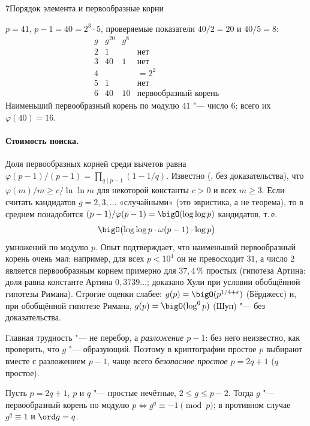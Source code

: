 \begin{lecture}{7}{Порядок элемента и первообразные корни}
\begin{example}\label{l7:ex-41}
$p = 41$, $p - 1 = 40 = 2^3 \cdot 5$, проверяемые показатели $40/2 = 20$ и $40/5 = 8$:
\[
\begin{array}{c|cc|l}
  g & g^{20} & g^{8} & \\ \hline
  2 & 1 & & \text{нет} \\
  3 & 40 & 1 & \text{нет} \\
  4 & & & = 2^2 \\
  5 & 1 & & \text{нет} \\
  6 & 40 & 10 & \text{первообразный корень}
\end{array}
\]
Наименьший первообразный корень по модулю $41$ "--- число $6$; всего их $\varphi(40) = 16$.
\end{example}


\paragraph{Стоимость поиска.} Доля первообразных корней среди вычетов равна
$\varphi(p - 1)/(p - 1) = \prod_{q \mid p - 1}(1 - 1/q)$. Известно
(\cite[теорема~328]{hardy-wright}, без доказательства), что
$\varphi(m)/m \ge c/\ln\ln m$ для некоторой константы $c > 0$ и всех $m \ge 3$. Если считать
кандидатов $g = 2, 3, \dots$ «случайными» (это эвристика, а не теорема), то в среднем
понадобится $(p - 1)/\varphi(p - 1) = \bigO(\log\log p)$ кандидатов, т.\,е.
\[
  \bigO\bigl(\log\log p \cdot \omega(p - 1) \cdot \log p\bigr)
\]
умножений по модулю $p$. Опыт подтверждает, что наименьший первообразный корень очень мал:
например, для всех $p < 10^4$ он не превосходит $31$, а число $2$ является первообразным
корнем примерно для $37{,}4\,\%$ простых (гипотеза Артина: доля равна константе Артина
$0{,}3739\ldots$; доказано Хули при условии обобщённой гипотезы Римана). Строгие оценки
слабее: $g(p) = \bigO(p^{1/4 + \varepsilon})$ (Бёрджесс) и, при обобщённой гипотезе Римана,
$g(p) = \bigO(\log^6 p)$ (Шуп) "--- без доказательства.

Главная трудность "--- не перебор, а \emph{разложение $p - 1$}: без него неизвестно, как
проверить, что $g$ "--- образующий. Поэтому в криптографии простое $p$ выбирают вместе с
разложением $p - 1$, чаще всего \emph{безопасное простое} $p = 2q + 1$ ($q$ простое).

\begin{proposition}\label{l7:safe-prime}
Пусть $p = 2q + 1$, $p$ и $q$ "--- простые нечётные, $2 \le g \le p - 2$. Тогда $g$ "---
первообразный корень по модулю $p \iff g^q \equiv -1 \pmod p$; в противном случае
$g^q \equiv 1$ и $\ord g = q$.
\end{proposition}


\end{lecture}
